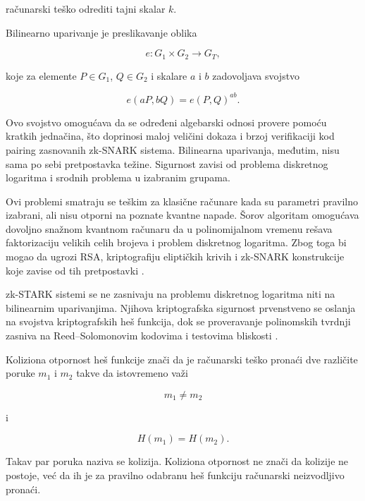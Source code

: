 računarski teško odrediti tajni skalar \(k\).

Bilinearno uparivanje je preslikavanje oblika

\begin{equation}
    e \colon G_1 \times G_2 \longrightarrow G_T,
\end{equation}

koje za elemente \(P \in G_1\), \(Q \in G_2\) i skalare \(a\) i \(b\)
zadovoljava svojstvo

\begin{equation}
    e(aP,bQ) = e(P,Q)^{ab}.
\end{equation}

Ovo svojstvo omogućava da se određeni algebarski odnosi provere pomoću kratkih
jednačina, što doprinosi maloj veličini dokaza i brzoj verifikaciji kod pairing
zasnovanih zk-SNARK sistema. Bilinearna uparivanja, međutim, nisu sama po sebi
pretpostavka težine. Sigurnost zavisi od problema diskretnog logaritma i srodnih
problema u izabranim grupama.

Ovi problemi smatraju se teškim za klasične računare kada su parametri pravilno
izabrani, ali nisu otporni na poznate kvantne napade. Šorov algoritam omogućava
dovoljno snažnom kvantnom računaru da u polinomijalnom vremenu rešava
faktorizaciju velikih celih brojeva i problem diskretnog logaritma. Zbog toga bi
mogao da ugrozi RSA, kriptografiju eliptičkih krivih i zk-SNARK konstrukcije
koje zavise od tih pretpostavki \cite{Shor_1997}.

zk-STARK sistemi se ne zasnivaju na problemu diskretnog logaritma niti na
bilinearnim uparivanjima. Njihova kriptografska sigurnost prvenstveno se oslanja
na svojstva kriptografskih heš funkcija, dok se proveravanje polinomskih tvrdnji
zasniva na Reed--Solomonovim kodovima i testovima bliskosti
\cite{stark2018,ethstark2023}.

Koliziona otpornost heš funkcije znači da je računarski teško pronaći dve
različite poruke \(m_1\) i \(m_2\) takve da istovremeno važi

\begin{equation}
    m_1 \neq m_2
\end{equation}

i

\begin{equation}
    H(m_1) = H(m_2).
\end{equation}

Takav par poruka naziva se kolizija. Koliziona otpornost ne znači da kolizije
ne postoje, već da ih je za pravilno odabranu heš funkciju računarski
neizvodljivo pronaći.

